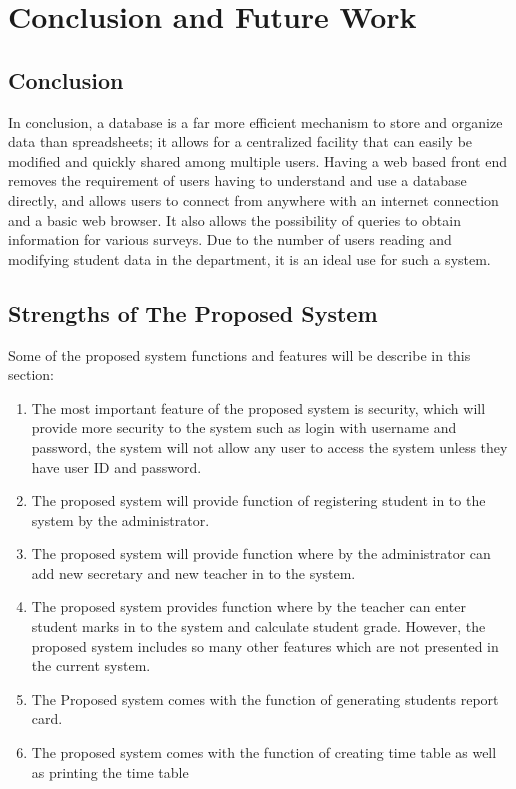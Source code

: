 \chapter{Conclusion and Future Work}
\label{chp5}
\section{Conclusion}
In conclusion, a database is a far more efficient mechanism to store and organize data than
spreadsheets; it allows for a centralized facility that can easily be modified and quickly shared among
multiple users. Having a web based front end removes the requirement of users having to understand
and use a database directly, and allows users to connect from anywhere with an internet connection and a basic web browser. It also allows the possibility of queries to obtain information for various surveys.
Due to the number of users reading and modifying student data in the department, it is an ideal use for
such a system.
\section{Strengths of The Proposed System}
Some of the proposed system functions and features will be describe in this section:
\begin{enumerate}
\item The most important feature of the proposed system is security, which will provide more security to the system such as login with username and password, the system will not allow any user to access the system unless they have user ID and password.
\item The proposed system will provide function of registering student in to the system by the administrator.
\item The proposed system will provide function where by the administrator can add new secretary and new teacher in to the system.
\item The proposed system provides function where by the teacher can enter student marks in to the system and calculate student grade. However, the proposed system includes so many other features which are not presented in the current system.
\item The Proposed system comes with the function of generating students report card.
\item The proposed system comes with the function of creating time table as well as printing the time table
\end{enumerate}

